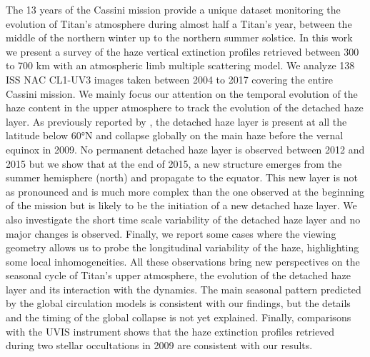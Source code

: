 The 13 years of the Cassini mission provide a unique dataset monitoring
the evolution of Titan’s atmosphere during almost half a Titan's year,
between the middle of the northern winter up to the northern summer solstice.
In this work we present a survey of the haze vertical extinction profiles retrieved
between 300 to 700 km with an atmospheric limb multiple scattering model.
We analyze 138 ISS NAC CL1-UV3 images taken between 2004 to 2017 covering the
entire Cassini mission.
We mainly focus our attention on the temporal evolution of the haze content
in the upper atmosphere to track the evolution of the detached haze layer.
As previously reported by \cite{West2011}, the detached haze layer is present
at all the latitude below \ang{60}N and collapse globally on the main haze
before the vernal equinox in 2009.
No permanent detached haze layer is observed between 2012 and 2015 but
we show that at the end of 2015, a new structure emerges from
the summer hemisphere (north) and propagate to the equator. This new layer
is not as pronounced and is much more complex than the one observed at the
beginning of the mission but is likely to be the initiation of a new detached haze layer.
We also investigate the short time scale variability of the detached haze
layer and no major changes is observed. Finally, we report some cases
where the viewing geometry allows us to probe the longitudinal variability
of the haze, highlighting some local inhomogeneities.
All these observations bring new perspectives
on the seasonal cycle of Titan's upper atmosphere, the evolution of the detached
haze layer and its interaction with the dynamics.
The main seasonal pattern predicted by the global circulation models is consistent
with our findings, but the details and the timing of the global collapse
is not yet explained. Finally, comparisons with the UVIS instrument shows
that the haze extinction profiles retrieved during two stellar occultations
in 2009 are consistent with our results.